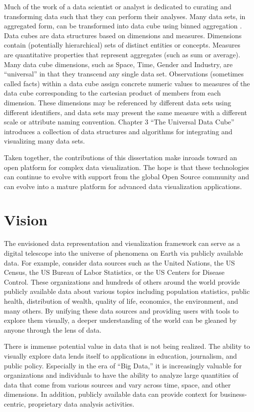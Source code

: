 Much of the work of a data scientist or analyst is dedicated to curating and transforming data such that they can perform their analyses. Many data sets, in aggregated form, can be transformed into data cube using binned aggregation \cite{liu2013immens}. Data cubes are data structures based on dimensions and measures. Dimensions contain (potentially hierarchical) sets of distinct entities or concepts. Measures are quantitative properties that represent aggregates (such as sum or average). Many data cube dimensions, such as Space, Time, Gender and Industry, are ``universal'' in that they transcend any single data set. Observations (sometimes called facts) within a data cube assign concrete numeric values to measures of the data cube corresponding to the cartesian product of members from each dimension. These dimensions may be referenced by different data sets using different identifiers, and data sets may present the same measure with a different scale or attribute naming convention. Chapter 3 ``The Universal Data Cube'' introduces a collection of data structures and algorithms for integrating and visualizing many data sets.

Taken together, the contributions of this dissertation make inroads toward an open platform for complex data visualization. The hope is that these technologies can continue to evolve with support from the global Open Source community and can evolve into a mature platform for advanced data visualization applications.

\section{Vision}
The envisioned data representation and visualization framework can serve as a digital telescope into the universe of phenomena on Earth via publicly available data. For example, consider data sources such as the United Nations, the US Census, the US Bureau of Labor Statistics, or the US Centers for Disease Control. These organizations and hundreds of others around the world provide publicly available data about various topics including population statistics, public health, distribution of wealth, quality of life, economics, the environment, and many others. By unifying these data sources and providing users with tools to explore them visually, a deeper understanding of the world can be gleaned by anyone through the lens of data.

There is immense potential value in data that is not being realized. The ability to visually explore data lends itself to applications in education, journalism, and public policy. Especially in the era of ``Big Data,'' it is increasingly valuable for organizations and individuals to have the ability to analyze large quantities of data that come from various sources and vary across time, space, and other dimensions. In addition, publicly available data can provide context for business-centric, proprietary data analysis activities.

